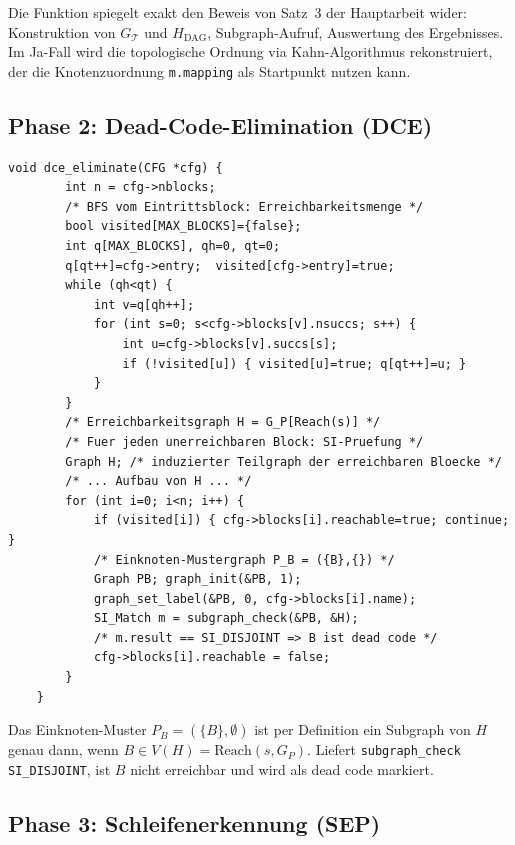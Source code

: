 ﻿\documentclass[a4paper,12pt]{article}
\theoremstyle{definition}
\begin{document}
Die Funktion spiegelt exakt den Beweis von Satz~3 der Hauptarbeit wider:
Konstruktion von $G_{\mathcal{T}}$ und $H_{\text{DAG}}$, Subgraph-Aufruf,
Auswertung des Ergebnisses. Im Ja-Fall wird die topologische Ordnung via
Kahn-Algorithmus rekonstruiert, der die Knotenzuordnung \texttt{m.mapping}
als Startpunkt nutzen kann.

\subsection{Phase 2: Dead-Code-Elimination (DCE)}
\label{sec:impl-dce}

\begin{lstlisting}[style=cstyle, caption={DCE -- Musterprüfung per SI
		(compiler\_full.c)}, label=lst:dce-impl]
	void dce_eliminate(CFG *cfg) {
		int n = cfg->nblocks;
		/* BFS vom Eintrittsblock: Erreichbarkeitsmenge */
		bool visited[MAX_BLOCKS]={false};
		int q[MAX_BLOCKS], qh=0, qt=0;
		q[qt++]=cfg->entry;  visited[cfg->entry]=true;
		while (qh<qt) {
			int v=q[qh++];
			for (int s=0; s<cfg->blocks[v].nsuccs; s++) {
				int u=cfg->blocks[v].succs[s];
				if (!visited[u]) { visited[u]=true; q[qt++]=u; }
			}
		}
		/* Erreichbarkeitsgraph H = G_P[Reach(s)] */
		/* Fuer jeden unerreichbaren Block: SI-Pruefung */
		Graph H; /* induzierter Teilgraph der erreichbaren Bloecke */
		/* ... Aufbau von H ... */
		for (int i=0; i<n; i++) {
			if (visited[i]) { cfg->blocks[i].reachable=true; continue; }
			/* Einknoten-Mustergraph P_B = ({B},{}) */
			Graph PB; graph_init(&PB, 1);
			graph_set_label(&PB, 0, cfg->blocks[i].name);
			SI_Match m = subgraph_check(&PB, &H);
			/* m.result == SI_DISJOINT => B ist dead code */
			cfg->blocks[i].reachable = false;
		}
	}
\end{lstlisting}

Das Einknoten-Muster $P_B = (\{B\}, \emptyset)$ ist per Definition ein
Subgraph von $H$ genau dann, wenn $B \in V(H) = \mathrm{Reach}(s, G_P)$.
Liefert \texttt{subgraph\_check} \texttt{SI\_DISJOINT}, ist $B$ nicht
erreichbar und wird als dead code markiert.

\subsection{Phase 3: Schleifenerkennung (SEP)}
\label{sec:impl-sep}
\end{document}

